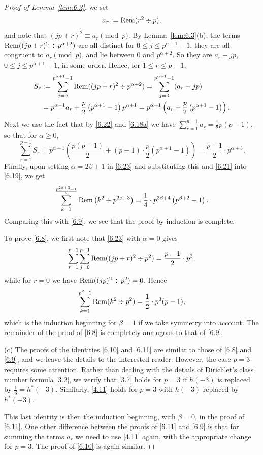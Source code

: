 \documentclass{amsart}
\theoremstyle{plain}
\numberwithin{equation}{section}
\begin{document}
\begin{proof}[Proof of Lemma~\ref{lem:6.2}]
we set
\begin{equation}\label{6.22}
a_r := {\rm Rem}(r^2\div p),
\end{equation}
and note that $(jp+r)^2\equiv a_r\pmod{p}$. By Lemma~\ref{lem:6.3}(b), the
terms ${\rm Rem}((jp+r)^2\div p^{\alpha+2})$ are all distinct for
$0\leq j\leq p^{\alpha+1}-1$, they are all congruent to $a_r\pmod{p}$, and lie
between 0 and $p^{\alpha+2}$. So they are $a_r+jp$, 
$0\leq j\leq p^{\alpha+1}-1$, in some order. Hence, for $1\leq r\leq p-1$,
\begin{align*}
S_r&:=\sum_{j=0}^{p^{\alpha+1}-1}{\rm Rem}((jp+r)^2\div p^{\alpha+2})
=\sum_{j=0}^{p^{\alpha+1}-1}(a_r+jp) \\
&= p^{\alpha+1}a_r + \frac{p}{2}\left(p^{\alpha+1}-1\right)p^{\alpha+1}
= p^{\alpha+1}\left(a_r+ \frac{p}{2}\left(p^{\alpha+1}-1\right)\right).
\end{align*}
Next we use the fact that by \eqref{6.22} and \eqref{6.18a} we have
$\sum_{r=1}^{p-1}a_r=\frac{1}{2}p(p-1)$, so that for $\alpha\geq 0$,
\begin{equation}\label{6.23}
\sum_{r=1}^{p-1}S_r
=p^{\alpha+1}\left(\frac{p(p-1)}{2}
+(p-1)\cdot\frac{p}{2}\left(p^{\alpha+1}-1\right)\right)
=\frac{p-1}{2}\cdot p^{\alpha+3}.
\end{equation}
Finally, upon setting $\alpha=2\beta+1$ in \eqref{6.23} and substituting this
and \eqref{6.21} into \eqref{6.19}, we get
\[
\sum_{k=1}^{\frac{p^{2\beta+3}-1}{2}}{\rm Rem}\left(k^2\div p^{2\beta+3}\right)
= \frac{1}{4}\cdot p^{3\beta+4}\left(p^{\beta+2}-1\right).
\]
Comparing this with \eqref{6.9}, we see that the proof by induction is complete.

To prove \eqref{6.8}, we first note that \eqref{6.23} with $\alpha=0$ gives
\[
\sum_{r=1}^{p-1}\sum_{j=0}^{p-1}{\rm Rem}((jp+r)^2\div p^2)
= \frac{p-1}{2}\cdot p^3,
\]
while for $r=0$ we have ${\rm Rem}((jp)^2\div p^2)=0$. Hence
\[
\sum_{k=1}^{p^2-1}{\rm Rem}(k^2\div p^2) = \frac{1}{2}\cdot p^3(p-1),
\]
which is the induction beginning for $\beta=1$ if we take symmetry into 
account. The remainder of the proof of \eqref{6.8} is completely analogous to
that of \eqref{6.9}.

(c) The proofs of the identities \eqref{6.10} and \eqref{6.11} are similar to
those of \eqref{6.8} and \eqref{6.9}, and we leave the details to the 
interested reader. However, the case $p=3$ requires some attention. Rather than
dealing with the details of Dirichlet's class number formula \eqref{3.2}, we
verify that \eqref{3.7} holds for $p=3$ if $h(-3)$ is replaced by 
$\frac{1}{3}=h^*(-3)$. Similarly, \eqref{4.11} holds for $p=3$ with $h(-3)$
replaced by $h^*(-3)$.

This last identity is then the induction beginning, with $\beta=0$, in the
proof of \eqref{6.11}. One other difference between the proofs of \eqref{6.11}
and \eqref{6.9} is that for summing the terms $a_r$ we need to use \eqref{4.11}
again, with the appropriate change for $p=3$. The proof of \eqref{6.10} is
again similar.
\end{proof}
\end{document}
